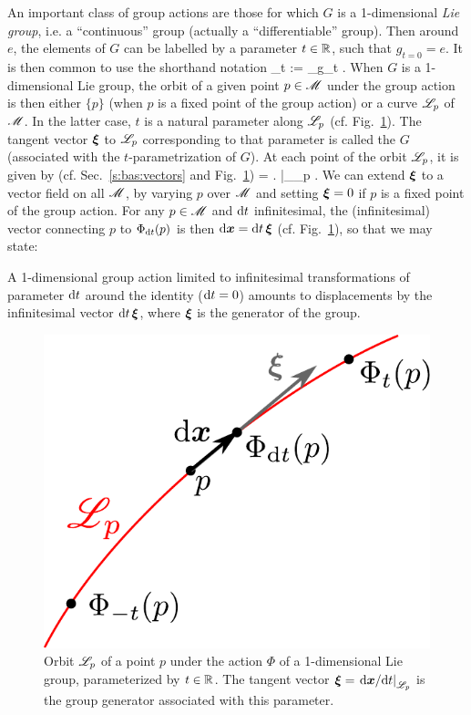 An important class of group actions are those for which $G$ is a 1-dimensional
\emph{Lie group}, i.e. a ``continuous'' group (actually a ``differentiable'' group).
Then around $e$, the elements of $G$ can be labelled by a parameter $t\in \mathbb{R}$, such that $g_{t=0} = e$. It is then
common to use the shorthand notation
\be
        \Phi_t := \Phi_{g_t} .
\ee
When $G$ is a 1-dimensional Lie group, the orbit of a given point $p\in\mathscr{M}$ under the group action is then either $\{p\}$ (when $p$ is a fixed point of the
group action) or a curve $\mathscr{L}_p$ of $\mathscr{M}$. In the latter case,
$t$ is a natural parameter along $\mathscr{L}_p$ (cf. Fig.~\ref{f:neh:orbit_group}). The tangent vector $\bm{\xi}$ to $\mathscr{L}_p$
corresponding to that parameter is called the  $G$
(associated with the $t$-parametrization of $G$). At each point of
the orbit $\mathscr{L}_p$, it is given by
(cf. Sec.~\ref{s:bas:vectors} and Fig.~\ref{f:neh:orbit_group})
\be \label{e:neh:xi_dxdt}
    \w{\xi} = \left.  \right|_{\Li_p} .
\ee
We can extend $\bm{\xi}$ to a vector field on all $\mathscr{M}$, by varying $p$
over $\mathscr{M}$ and setting $\bm{\xi} = 0$ if $p$ is a fixed point
of the group action.
For any $p\in\mathscr{M}$ and $\mathrm{d} t$ infinitesimal, the (infinitesimal)
vector connecting $p$ to $\Phi_{\mathrm{d} t}(p)$ is then $\mathrm{d}\bm{x} = \mathrm{d} t \, \bm{\xi}$
(cf. Fig.~\ref{f:neh:orbit_group}), so that we may state:
\begin{prop}
A 1-dimensional group action limited to infinitesimal transformations of parameter
$\mathrm{d} t$ around the identity ($\mathrm{d} t =0$) amounts to displacements by the infinitesimal vector $\mathrm{d} t\, \bm{\xi}$, where $\bm{\xi}$ is the generator of the group.
\end{prop}

\begin{figure}
\centerline{\includegraphics[height=0.25\textheight]{def_orbit_group.pdf}}
\caption[]{\label{f:neh:orbit_group} \footnotesize
Orbit $\mathscr{L}_p$ of a point $p$ under the action $\Phi$ of a 1-dimensional Lie group, parameterized
by $t\in\mathbb{R}$. The tangent vector $\bm{\xi} = \left. \mathrm{d}\bm{x}/\mathrm{d} t \right| _{\mathscr{L}_p}$ is the group
generator associated with this parameter.}
\end{figure}


